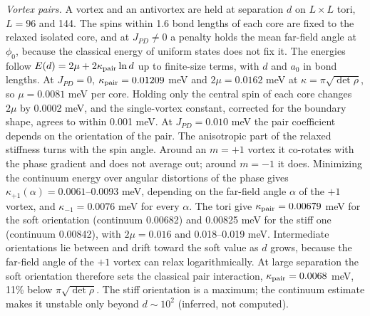 \emph{Vortex pairs.} A vortex and an antivortex are held at separation
\(d\) on \(L\times L\) tori, \(L=96\) and 144. The spins within 1.6
bond lengths of each core are fixed to the relaxed isolated core, and at
\(J_{PD}\neq0\) a penalty holds the mean far-field angle at \(\phi_0\),
because the classical energy of uniform states does not fix it. The
energies follow \(E(d)=2\mu+2\kappa_{\rm pair}\ln d\) up to
finite-size terms, with \(d\) and \(a_0\) in bond lengths. At
\(J_{PD}=0\), \(\kappa_{\rm pair}=0.01209\) meV and
\(2\mu=0.0162\) meV at \(\kappa=\pi\sqrt{\det\rho}\), so
\(\mu=0.0081\) meV per core. Holding only the central spin of each
core changes \(2\mu\) by 0.0002 meV, and the single-vortex constant,
corrected for the boundary shape, agrees to within 0.001 meV. At
\(J_{PD}=0.010\) meV the pair coefficient depends on the orientation
of the pair. The anisotropic part of the relaxed stiffness turns with
the spin angle. Around an \(m=+1\) vortex it co-rotates with the phase
gradient and does not average out; around \(m=-1\) it does.
Minimizing the continuum energy over angular distortions of the phase
gives \(\kappa_{+1}(\alpha)=0.0061\)--0.0093 meV, depending on the
far-field angle \(\alpha\) of the \(+1\) vortex, and
\(\kappa_{-1}=0.0076\) meV for every \(\alpha\). The tori give
\(\kappa_{\rm pair}=0.00679\) meV for the soft orientation (continuum
0.00682) and 0.00825 meV for the stiff one (continuum 0.00842), with
\(2\mu=0.016\) and 0.018--0.019 meV. Intermediate orientations lie
between and drift toward the soft value as \(d\) grows, because the
far-field angle of the \(+1\) vortex can relax logarithmically. At
large separation the soft orientation therefore sets the classical
pair interaction, \(\kappa_{\rm pair}=0.0068\) meV, 11\% below
\(\pi\sqrt{\det\rho}\). The stiff orientation is a maximum; the
continuum estimate makes it unstable only beyond \(d\sim10^2\)
(inferred, not computed).

